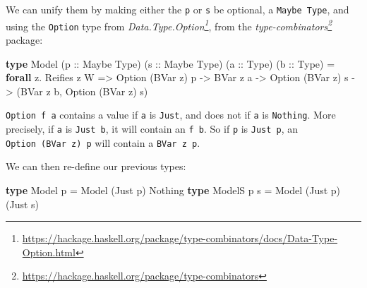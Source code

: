 \documentclass[]{article}
\newenvironment{Shaded}{}{}
\newcommand{\DataTypeTok}[1]{\textcolor[rgb]{0.56,0.13,0.00}{#1}}
\newcommand{\KeywordTok}[1]{\textcolor[rgb]{0.00,0.44,0.13}{\textbf{#1}}}
\newcommand{\NormalTok}[1]{#1}
\newcommand{\OperatorTok}[1]{\textcolor[rgb]{0.40,0.40,0.40}{#1}}
\newcommand{\OtherTok}[1]{\textcolor[rgb]{0.00,0.44,0.13}{#1}}
\renewcommand{\href}[2]{#2\footnote{\url{#1}}}
\begin{document}
We can unify them by making either the \texttt{p} or \texttt{s} be optional, a
\texttt{Maybe\ Type}, and using the \texttt{Option} type from
\emph{\href{https://hackage.haskell.org/package/type-combinators/docs/Data-Type-Option.html}{Data.Type.Option}},
from the
\emph{\href{https://hackage.haskell.org/package/type-combinators}{type-combinators}}
package:

\begin{Shaded}
\begin{Highlighting}[]
\KeywordTok{type} \DataTypeTok{Model\textquotesingle{}}\NormalTok{ (}\OtherTok{p ::} \DataTypeTok{Maybe} \DataTypeTok{Type}\NormalTok{) (}\OtherTok{s ::} \DataTypeTok{Maybe} \DataTypeTok{Type}\NormalTok{) (}\OtherTok{a ::} \DataTypeTok{Type}\NormalTok{) (}\OtherTok{b ::} \DataTypeTok{Type}\NormalTok{) }\OtherTok{=}
       \KeywordTok{forall}\NormalTok{ z}\OperatorTok{.} \DataTypeTok{Reifies}\NormalTok{ z }\DataTypeTok{W}
    \OtherTok{=\textgreater{}} \DataTypeTok{Option}\NormalTok{ (}\DataTypeTok{BVar}\NormalTok{ z) p}
    \OtherTok{{-}\textgreater{}} \DataTypeTok{BVar}\NormalTok{ z a}
    \OtherTok{{-}\textgreater{}} \DataTypeTok{Option}\NormalTok{ (}\DataTypeTok{BVar}\NormalTok{ z) s}
    \OtherTok{{-}\textgreater{}}\NormalTok{ (}\DataTypeTok{BVar}\NormalTok{ z b, }\DataTypeTok{Option}\NormalTok{ (}\DataTypeTok{BVar}\NormalTok{ z) s)}
\end{Highlighting}
\end{Shaded}

\texttt{Option\ f\ a} contains a value if \texttt{a} is
\texttt{\textquotesingle{}Just}, and does not if \texttt{a} is
\texttt{\textquotesingle{}Nothing}. More precisely, if \texttt{a} is
\texttt{\textquotesingle{}Just\ b}, it will contain an \texttt{f\ b}. So if
\texttt{p} is \texttt{\textquotesingle{}Just\ p\textquotesingle{}}, an
\texttt{Option\ (BVar\ z)\ p} will contain a
\texttt{BVar\ z\ p\textquotesingle{}}.

We can then re-define our previous types:

\begin{Shaded}
\begin{Highlighting}[]
\KeywordTok{type} \DataTypeTok{Model}\NormalTok{  p   }\OtherTok{=} \DataTypeTok{Model\textquotesingle{}}\NormalTok{ (}\DataTypeTok{\textquotesingle{}Just}\NormalTok{ p) }\DataTypeTok{\textquotesingle{}Nothing}
\KeywordTok{type} \DataTypeTok{ModelS}\NormalTok{ p s }\OtherTok{=} \DataTypeTok{Model\textquotesingle{}}\NormalTok{ (}\DataTypeTok{\textquotesingle{}Just}\NormalTok{ p) (}\DataTypeTok{\textquotesingle{}Just}\NormalTok{ s)}
\end{Highlighting}
\end{Shaded}
\end{document}

